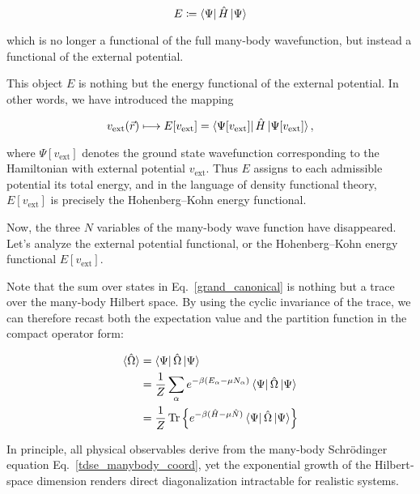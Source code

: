 \begin{equation}
E \coloneqq \bra{\Psi}\hat H\ket{\Psi}
\label{external_potential}
\end{equation}

which is no longer a functional of the full many‐body wavefunction, but instead a functional of the external potential.  

This object $E$ is nothing but the energy functional of the external potential. In other words, we have introduced the mapping

\begin{equation}
v_{\mathrm{ext}}(\vec{r}) \longmapsto E[v_{\mathrm{ext}}] = \bra{\Psi[v_{\mathrm{ext}}]}\hat{H}\ket{\Psi[v_{\mathrm{ext}}]},
\label{external_potential_mapping}
\end{equation}

where $\Psi[v_{\mathrm{ext}}]$ denotes the ground state wavefunction corresponding to the Hamiltonian with external potential $v_{\mathrm{ext}}$.  Thus $E$ assigns to each admissible potential its total energy, and in the language of density functional theory, $E[v_{\mathrm{ext}}]$ is precisely the Hohenberg–Kohn energy functional.

Now, the three $N$ variables of the many-body wave function have disappeared. Let's analyze the external potential functional, or the Hohenberg–Kohn energy functional $ E[v_{\mathrm{ext}}]$.

Note that the sum over states in Eq.~\eqref{grand_canonical} is nothing but a trace over the many‐body Hilbert space.  By using the cyclic invariance of the trace, we can therefore recast both the expectation value and the partition function in the compact operator form:

\begin{equation}
\begin{aligned}
\braket{\hat\Omega}
&= \bra{\Psi}\hat\Omega\ket{\Psi} \\
&= \frac{1}{Z}\sum_\alpha e^{-\beta(E_\alpha-\mu N_\alpha)}\bra{\Psi}\hat\Omega\ket{\Psi} \\
&= \frac{1}{Z}\operatorname{Tr}\left\{e^{-\beta(\hat{H}-\mu\hat{N})}\bra{\Psi}\hat\Omega\ket{\Psi}\right\}
\end{aligned}
\label{grand_canonical_trace}
\end{equation}

In principle, all physical observables derive from the many‐body Schrödinger equation Eq.~\eqref{tdse_manybody_coord}, yet the exponential growth of the Hilbert‐space dimension renders direct diagonalization intractable for realistic systems.


